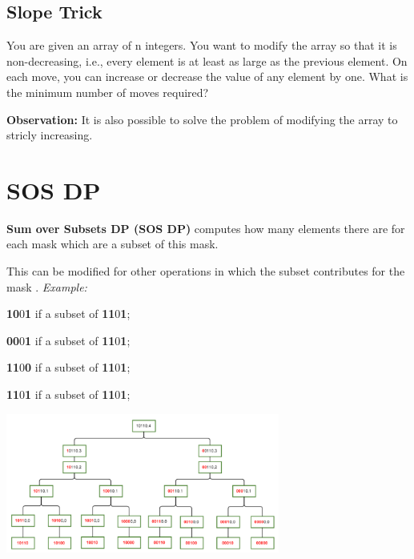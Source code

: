 
    \subsection{Slope Trick}
    
    You are given an array of n integers. You want to modify the array so that it is non-decreasing, i.e., every element is at least as large as the previous element.
    On each move, you can increase or decrease the value of any element by one. What is the minimum number of moves required?
    
    \textbf{Observation: } It is also possible to solve the problem of modifying the array to stricly increasing.


\section{SOS DP}

    \textbf{Sum over Subsets DP (SOS DP)} computes how many elements there are for each mask
    which are a subset of this mask.

    This can be modified for other operations in which the subset contributes for the mask
    .
    \textit{Example:}

    \textbf{10}0\textbf{1} if a subset of \textbf{11}0\textbf{1};

    \textbf{00}0\textbf{1} if a subset of \textbf{11}0\textbf{1};
    
    \textbf{11}0\textbf{0} if a subset of \textbf{11}0\textbf{1};
    
    \textbf{11}0\textbf{1} if a subset of \textbf{11}0\textbf{1};

    \begin{center}
        \includegraphics[width=9cm]{content/dynamic-programming/sos-example.pdf}
    \end{center}


